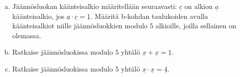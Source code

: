 \begin{kotitehtavasivu}
\begin{tehtava}
\begin{enumerate}[a)]
	\item Jäännösluokan käänteisalkio määritellään seuraavasti: $\underline{c}$ on alkion $\underline{a}$ käänteisalkio, jos $\underline{a} \cdot \underline{c} = \underline{1}$. Määritä b-kohdan taulukoiden avulla käänteisalkiot niille jäännösluokkien modulo $5$ alkioille, joilla sellainen on olemassa.
	\item Ratkaise jäännösluokissa modulo $5$ yhtälö $\underline{x}+\underline{x}=\underline{1}$.
	\item Ratkaise jäännösluokissa modulo $5$ yhtälö $\underline{x}\cdot \underline{x}=\underline{4}$.
	\end{enumerate}
\end{tehtava}

\end{kotitehtavasivu}
